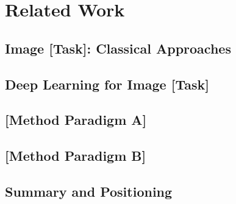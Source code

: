 \documentclass[journal,onecolumn,draftcls]{IEEEtran}
\begin{document}
\section{Related Work}
\label{sec:related}


\subsection{Image [Task]: Classical Approaches}
\label{sec:related-classical}


\subsection{Deep Learning for Image [Task]}
\label{sec:related-dl}


\subsection{[Method Paradigm A]}
\label{sec:related-paradigmA}


\subsection{[Method Paradigm B]}
\label{sec:related-paradigmB}


\subsection{Summary and Positioning}
\label{sec:related-summary}
\end{document}
